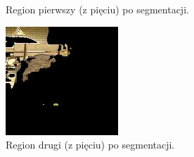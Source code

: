 \documentclass[10pt]{llncs}
\begin{document}
\begin{figure}[!htb]
  \caption{Region pierwszy (z pięciu) po segmentacji.}\label{fig:11}
\endminipage\hfill
{}
  \includegraphics[width=\linewidth]{img/images_k5_1.jpg}
  \caption{Region drugi (z pięciu) po segmentacji.}\label{fig:12}
\endminipage
\end{figure}
\end{document}
